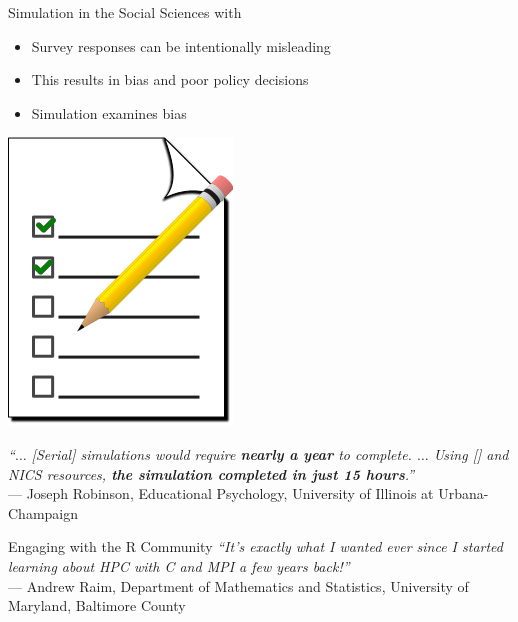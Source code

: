 \begin{frame}
  \begin{block}{Simulation in the Social Sciences with \pbdR}
  \begin{minipage}[b]{.88\textwidth}
  \begin{itemize}\small
    \item Survey responses can be intentionally misleading
    \item This results in bias and poor policy decisions
    \item Simulation examines bias
    \end{itemize}
  \end{minipage}
  \begin{minipage}[b]{.10\textwidth}
    \includegraphics[scale=0.13]{../common/pics/survey}\vspace{.2cm}
  \end{minipage}
  \emph{``$\ldots$ [Serial] simulations would require {\bf nearly a
      year} to complete. $\ldots$ Using [\pbdR] and NICS resources,
    {\bf the simulation completed in just 15 hours}.''} \\
 --- Joseph Robinson, Educational Psychology, University of Illinois at
  Urbana-Champaign
  \end{block}

  \begin{block}{Engaging with the R Community}
    \emph{``It's exactly what I wanted ever since I started learning about HPC 
      with C and MPI a few years back!''} \\ --- Andrew Raim,
    Department of Mathematics and Statistics, University of Maryland, 
    Baltimore County
  \end{block}
\end{frame}

